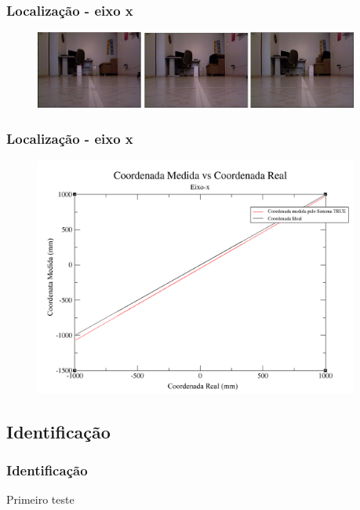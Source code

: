 \documentclass{beamer}
\begin{document}
    	\begin{frame}
	    	\frametitle{Localização - eixo x}
	    	
	    	\begin{figure}[htb]
				\begin{center}
					\includegraphics[width=0.95\textwidth]{figuras/5.Testes/teste-eixox.png}
				\end{center}
			\end{figure}
	    \end{frame}
	        
    	\begin{frame}
	    	\frametitle{Localização - eixo x}
	    	
	    	\begin{figure}[htb]
				\begin{center}
					\includegraphics[width=0.95\textwidth]{figuras/5.Testes/grafico-eixo-x.png}
				\end{center}
			\end{figure}
	    \end{frame}
	    
   
    \subsection{Identificação}
	    \begin{frame}
	    	\frametitle{Identificação}
	    	
	    	Primeiro teste
	    \end{frame}
	    
\end{document}
